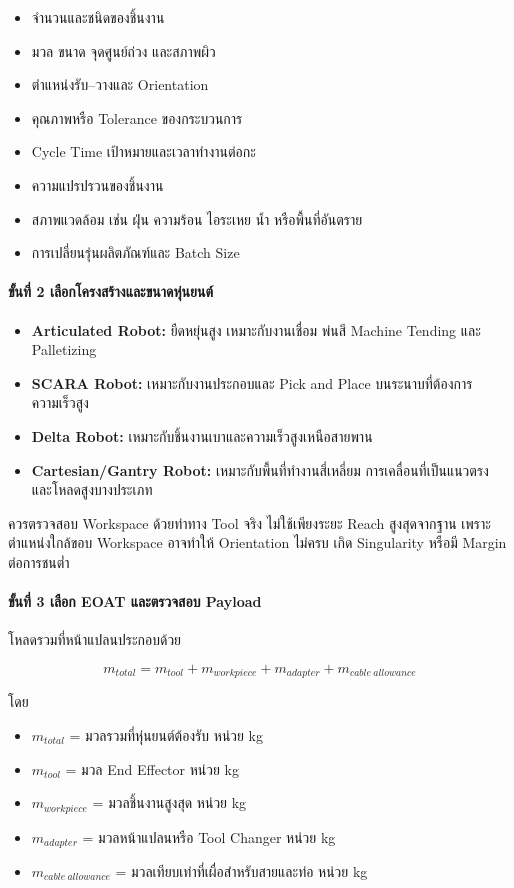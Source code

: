\begin{itemize}
    \item จำนวนและชนิดของชิ้นงาน
    \item มวล ขนาด จุดศูนย์ถ่วง และสภาพผิว
    \item ตำแหน่งรับ–วางและ Orientation
    \item คุณภาพหรือ Tolerance ของกระบวนการ
    \item Cycle Time เป้าหมายและเวลาทำงานต่อกะ
    \item ความแปรปรวนของชิ้นงาน
    \item สภาพแวดล้อม เช่น ฝุ่น ความร้อน ไอระเหย น้ำ หรือพื้นที่อันตราย
    \item การเปลี่ยนรุ่นผลิตภัณฑ์และ Batch Size
\end{itemize}

\paragraph{ขั้นที่ 2 เลือกโครงสร้างและขนาดหุ่นยนต์}

\begin{itemize}
    \item \textbf{Articulated Robot:} ยืดหยุ่นสูง เหมาะกับงานเชื่อม พ่นสี Machine Tending และ Palletizing
    \item \textbf{SCARA Robot:} เหมาะกับงานประกอบและ Pick and Place บนระนาบที่ต้องการความเร็วสูง
    \item \textbf{Delta Robot:} เหมาะกับชิ้นงานเบาและความเร็วสูงเหนือสายพาน
    \item \textbf{Cartesian/Gantry Robot:} เหมาะกับพื้นที่ทำงานสี่เหลี่ยม การเคลื่อนที่เป็นแนวตรง และโหลดสูงบางประเภท
\end{itemize}

ควรตรวจสอบ Workspace ด้วยท่าทาง Tool จริง ไม่ใช้เพียงระยะ Reach สูงสุดจากฐาน เพราะตำแหน่งใกล้ขอบ Workspace อาจทำให้ Orientation ไม่ครบ เกิด Singularity หรือมี Margin ต่อการชนต่ำ

\paragraph{ขั้นที่ 3 เลือก EOAT และตรวจสอบ Payload}

โหลดรวมที่หน้าแปลนประกอบด้วย

\[
m_{total}=m_{tool}+m_{workpiece}+m_{adapter}+m_{cable\ allowance}
\]

โดย

\begin{itemize}
    \item $m_{total}$ = มวลรวมที่หุ่นยนต์ต้องรับ หน่วย kg
    \item $m_{tool}$ = มวล End Effector หน่วย kg
    \item $m_{workpiece}$ = มวลชิ้นงานสูงสุด หน่วย kg
    \item $m_{adapter}$ = มวลหน้าแปลนหรือ Tool Changer หน่วย kg
    \item $m_{cable\ allowance}$ = มวลเทียบเท่าที่เผื่อสำหรับสายและท่อ หน่วย kg
\end{itemize}

